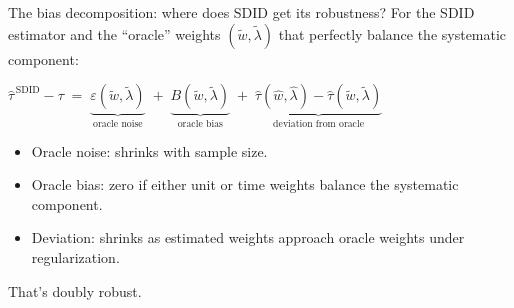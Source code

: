 \documentclass[aspectratio=169,11pt]{beamer}
\begin{document}
\begin{frame}{The bias decomposition: where does SDID get its robustness?}
\vspace{0.6em}
For the SDID estimator and the ``oracle'' weights $(\widetilde{w}, \widetilde{\lambda})$ that perfectly balance the systematic component:

\vspace{0.5em}
\begin{center}\small
$\widehat{\tau}^{\,\text{SDID}} - \tau \;=\; \underbrace{\varepsilon(\widetilde{w}, \widetilde{\lambda})}_{\text{oracle noise}} \;+\; \underbrace{B(\widetilde{w}, \widetilde{\lambda})}_{\text{oracle bias}} \;+\; \underbrace{\widehat{\tau}(\widehat{w}, \widehat{\lambda}) - \widehat{\tau}(\widetilde{w}, \widetilde{\lambda})}_{\text{deviation from oracle}}$
\end{center}

\vspace{0.7em}
\begin{itemize}\small
  \item Oracle noise: shrinks with sample size.
  \item Oracle bias: zero if either unit or time weights balance the systematic component.
  \item Deviation: shrinks as estimated weights approach oracle weights under regularization.
\end{itemize}

\vspace{0.5em}
 \;That's doubly robust.
\end{frame}
\end{document}
